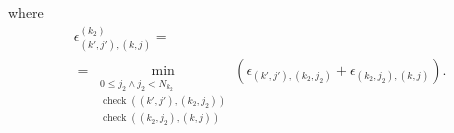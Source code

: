 \documentclass[conference]{IEEEtran}
\DeclareMathOperator{\functioncheck}{check}
\begin{document}
where
\begin{multline*}
  \epsilon
  _
  {
    \left( k', j' \right),
    \left( k, j \right)
  }
  ^
  {
    \left( k_2 \right)
  }
  =
  \\
  =
  \min
  _
  {
    \begin{aligned}
      0 \leq j_2 \wedge j_2 < N_{k_2}\\
      \functioncheck
      {
        \left(
          \left( k', j' \right),
          \left( k_2, j_2 \right)
        \right)
      }\\
      \functioncheck
      {
        \left(
          \left( k_2, j_2 \right),
          \left( k, j \right)
        \right)
      }
    \end{aligned}
  }
  {
    \left(
      \epsilon
      _
      {
        \left( k', j' \right),
        \left( k_2, j_2 \right)
      }
      +
      \epsilon
      _
      {
        \left( k_2, j_2 \right),
        \left( k, j \right)
      }
    \right)
  }
  .
\end{multline*}
\end{document}
